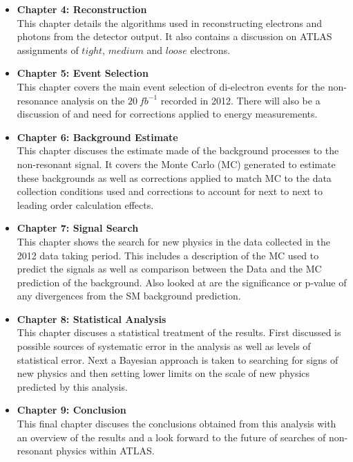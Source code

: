\begin{itemize}
{}
\item{ 
{\bf Chapter 4: Reconstruction} \\
This chapter details the algorithms used in reconstructing electrons and photons from the detector output. It also contains a discussion on ATLAS assignments of $tight$, $medium$ and $loose$ electrons.
}
\item{ 
{\bf Chapter 5: Event Selection} \\
This chapter covers the main event selection of di-electron events for the non-resonance analysis on the $20~fb^{-1}$ recorded in 2012. There will also be a discussion of and need for corrections applied to energy measurements.
}
\item{ 
{\bf Chapter 6: Background Estimate} \\
This chapter discuses the estimate made of the background processes to the non-resonant signal. It covers the Monte Carlo (MC) generated to estimate these backgrounds as well as corrections applied to match MC to the data collection conditions used and corrections to account for next to next to leading order calculation effects.
}
\item{ 
{\bf Chapter 7: Signal Search} \\
This chapter shows the search for new physics in the data collected in the 2012 data taking period. This includes a description of the MC used to predict the signals as well as comparison between the Data and the MC prediction of the background. Also looked at are the significance or p-value of any divergences from the SM background prediction.
}
\item{ 
{\bf Chapter 8: Statistical Analysis} \\
This chapter discuses a statistical treatment of the results. First discussed is possible sources of systematic error in the analysis as well as levels of statistical error. Next a Bayesian approach is taken to searching for signs of new physics and then setting lower limits on the scale of new physics predicted by this analysis.
}
\item{ 
{\bf Chapter 9: Conclusion} \\
This final chapter discuses the conclusions obtained from this analysis with an overview of the results and a look forward to the future of searches of non-resonant physics within ATLAS.
}
\end{itemize}



